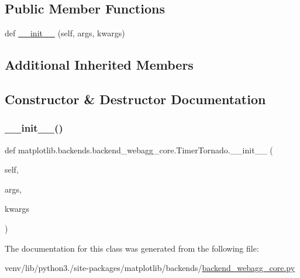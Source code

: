 \subsection*{Public Member Functions}
\begin{DoxyCompactItemize}
\item 
def \hyperlink{classmatplotlib_1_1backends_1_1backend__webagg__core_1_1TimerTornado_a59f65fc9c271cff2cb5299c6ce222a2e}{\+\_\+\+\_\+init\+\_\+\+\_\+} (self, args, kwargs)
\end{DoxyCompactItemize}
\subsection*{Additional Inherited Members}


\subsection{Constructor \& Destructor Documentation}
\mbox{\label{classmatplotlib_1_1backends_1_1backend__webagg__core_1_1TimerTornado_a59f65fc9c271cff2cb5299c6ce222a2e}} 
\subsubsection{\texorpdfstring{\+\_\+\+\_\+init\+\_\+\+\_\+()}{\_\_init\_\_()}}
{\footnotesize\ttfamily def matplotlib.\+backends.\+backend\+\_\+webagg\+\_\+core.\+Timer\+Tornado.\+\_\+\+\_\+init\+\_\+\+\_\+ (\begin{DoxyParamCaption}\item[{}]{self,  }\item[{}]{args,  }\item[{}]{kwargs }\end{DoxyParamCaption})}



The documentation for this class was generated from the following file\+:\begin{DoxyCompactItemize}
\item 
venv/lib/python3./site-\/packages/matplotlib/backends/\hyperlink{backend__webagg__core_8py}{backend\+\_\+webagg\+\_\+core.\+py}\end{DoxyCompactItemize}
